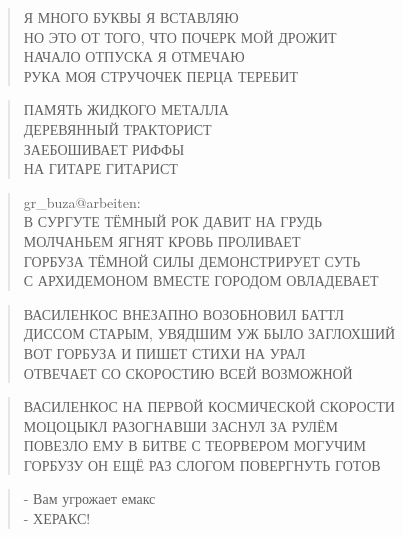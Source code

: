 \poemtitle{***}
\begin{verse}
Я МНОГО БУКВЫ Я ВСТАВЛЯЮ\\
НО ЭТО ОТ ТОГО, ЧТО ПОЧЕРК МОЙ ДРОЖИТ\\
НАЧАЛО ОТПУСКА Я ОТМЕЧАЮ\\
РУКА МОЯ СТРУЧОЧЕК ПЕРЦА ТЕРЕБИТ
\end{verse}

\poemtitle{***}
\begin{verse}
ПАМЯТЬ ЖИДКОГО МЕТАЛЛА\\
ДЕРЕВЯННЫЙ ТРАКТОРИСТ\\
ЗАЕБОШИВАЕТ РИФФЫ\\
НА ГИТАРЕ ГИТАРИСТ
\end{verse}

\poemtitle{***}
\begin{verse}
gr\_buza@arbeiten: \\
В СУРГУТЕ ТЁМНЫЙ РОК ДАВИТ НА ГРУДЬ\\
МОЛЧАНЬЕМ ЯГНЯТ КРОВЬ ПРОЛИВАЕТ\\
ГОРБУЗА ТЁМНОЙ СИЛЫ ДЕМОНСТРИРУЕТ СУТЬ\\
С АРХИДЕМОНОМ ВМЕСТЕ ГОРОДОМ ОВЛАДЕВАЕТ
\end{verse}

\poemtitle{***}
\begin{verse}
ВАСИЛЕНКОС ВНЕЗАПНО ВОЗОБНОВИЛ БАТТЛ\\
ДИССОМ СТАРЫМ, УВЯДШИМ УЖ БЫЛО ЗАГЛОХШИЙ\\
ВОТ ГОРБУЗА И ПИШЕТ СТИХИ НА УРАЛ\\
ОТВЕЧАЕТ СО СКОРОСТИЮ ВСЕЙ ВОЗМОЖНОЙ
\end{verse}

\poemtitle{***}
\begin{verse}
ВАСИЛЕНКОС НА ПЕРВОЙ КОСМИЧЕСКОЙ СКОРОСТИ\\
МОЦОЦЫКЛ РАЗОГНАВШИ ЗАСНУЛ ЗА РУЛЁМ\\
ПОВЕЗЛО ЕМУ В БИТВЕ С ТЕОРВЕРОМ МОГУЧИМ\\
ГОРБУЗУ ОН ЕЩЁ РАЗ СЛОГОМ ПОВЕРГНУТЬ ГОТОВ
\end{verse}

\poemtitle{***}
\begin{verse}
- Вам угрожает емакс\\
- ХЕРАКС!
\end{verse}

